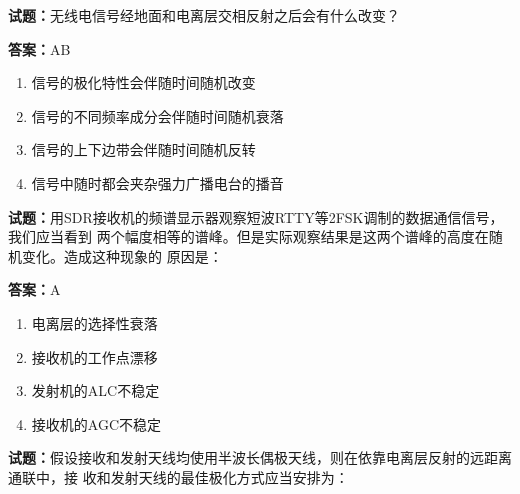 \documentclass{ctexbook}
\begin{document}





\vspace{1em}

\textbf{试题：}无线电信号经地面和电离层交相反射之后会有什么改变？ 

\textbf{答案：}AB 

\begin{enumerate}[leftmargin=3em]
  \item 信号的极化特性会伴随时间随机改变 

  \item 信号的不同频率成分会伴随时间随机衰落 

  \item 信号的上下边带会伴随时间随机反转 

  \item 信号中随时都会夹杂强力广播电台的播音 

\end{enumerate}





\vspace{1em}

\textbf{试题：}用SDR接收机的频谱显示器观察短波RTTY等2FSK调制的数据通信信号，我们应当看到
两个幅度相等的谱峰。但是实际观察结果是这两个谱峰的高度在随机变化。造成这种现象的
原因是： 

\textbf{答案：}A 

\begin{enumerate}[leftmargin=3em]
  \item 电离层的选择性衰落 

  \item 接收机的工作点漂移 

  \item 发射机的ALC不稳定 

  \item 接收机的AGC不稳定 

\end{enumerate}





\vspace{1em}

\textbf{试题：}假设接收和发射天线均使用半波长偶极天线，则在依靠电离层反射的远距离通联中，接
收和发射天线的最佳极化方式应当安排为： 
\end{document}
